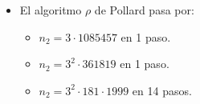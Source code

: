 \begin{enumerate}
\begin{itemize}
\begin{itemize}
				\item El algoritmo $\rho$ de Pollard pasa por:
				\begin{itemize}
					\item $n_2 = 3 \cdot 1085457$ en 1 paso.
					\item $n_2 = 3^2 \cdot 361819$ en 1 paso.
					\item $n_2 = 3^2 \cdot 181 \cdot 1999$ en 14 pasos.
				\end{itemize}
			\end{itemize}
			
		\end{itemize}
	\end{enumerate}